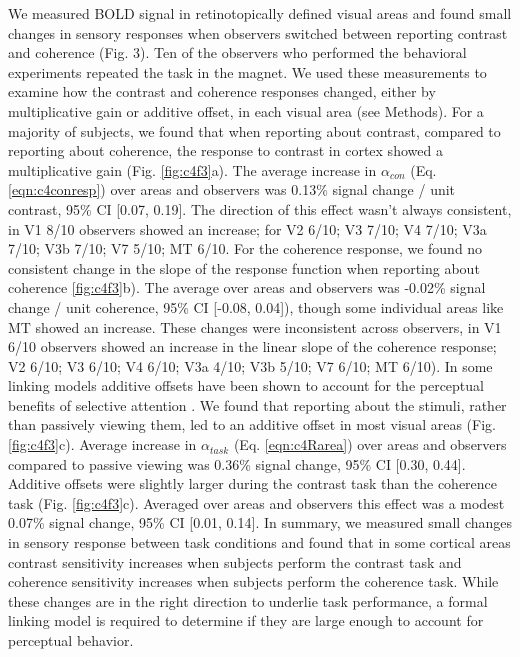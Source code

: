 \documentclass{report}
\begin{document}
We measured BOLD signal in retinotopically defined visual areas and found small changes in sensory responses when observers switched between reporting contrast and coherence (Fig. 3). Ten of the observers who performed the behavioral experiments repeated the task in the magnet. We used these measurements to examine how the contrast and coherence responses changed, either by multiplicative gain or additive offset, in each visual area (see Methods). For a majority of subjects, we found that when reporting about contrast, compared to reporting about coherence, the response to contrast in cortex showed a multiplicative gain (Fig. \ref{fig:c4f3}a). The average increase in $\alpha_{con}$ (Eq. \ref{eqn:c4conresp}) over areas and observers was 0.13\% signal change / unit contrast, 95\% CI [0.07, 0.19]. The direction of this effect wasn’t always consistent, in V1 8/10 observers showed an increase; for V2 6/10; V3 7/10; V4 7/10; V3a 7/10; V3b 7/10; V7 5/10; MT 6/10. For the coherence response, we found no consistent change in the slope of the response function when reporting about coherence \ref{fig:c4f3}b). The average over areas and observers was -0.02\% signal change / unit coherence, 95\% CI [-0.08, 0.04]), though some individual areas like MT showed an increase. These changes were inconsistent across observers, in V1 6/10 observers showed an increase in the linear slope of the coherence response; V2 6/10; V3 6/10; V4 6/10; V3a 4/10; V3b 5/10; V7 6/10; MT 6/10). In some linking models additive offsets have been shown to account for the perceptual benefits of selective attention \citep{Pestilli2011-gi}. We found that reporting about the stimuli, rather than passively viewing them, led to an additive offset in most visual areas (Fig. \ref{fig:c4f3}c). Average increase in $\alpha_{task}$ (Eq. \ref{eqn:c4Rarea}) over areas and observers compared to passive viewing was 0.36\% signal change, 95\% CI [0.30, 0.44]. Additive offsets were slightly larger during the contrast task than the coherence task (Fig. \ref{fig:c4f3}c). Averaged over areas and observers this effect was a modest 0.07\% signal change, 95\% CI [0.01, 0.14]. In summary, we measured small changes in sensory response between task conditions and found that in some cortical areas contrast sensitivity increases when subjects perform the contrast task and coherence sensitivity increases when subjects perform the coherence task. While these changes are in the right direction to underlie task performance, a formal linking model is required to determine if they are large enough to account for perceptual behavior.
\end{document}
